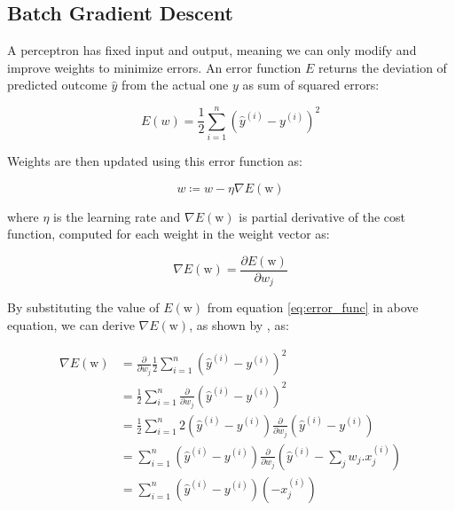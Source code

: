 \subsection{Batch Gradient Descent}\label{subsection:bgd}

A perceptron has fixed input and output, meaning we can only modify and improve weights to minimize errors. An error function $E$ returns the deviation of predicted outcome $\hat{y}$ from the actual one $y$ as sum of squared errors:

\begin{equation}
    \label{eq:error_func}
    E(w) = \frac{1}{2} \sum_{i=1}^{n}(\hat{y}^{(i)} - y^{(i)})^2
\end{equation}

Weights are then updated using this error function as:

\begin{equation}
    \label{eq:weight_update}
    w \coloneqq w - \eta \nabla E(\text{w})
\end{equation}

where $\eta$ is the learning rate and $\nabla E(\text{w})$ is partial derivative of the cost function, computed for each weight in the weight vector as:

\begin{equation}
    \label{eq:part_der}
    \nabla E(\text{w}) = \frac{\partial E(\text{w})}{\partial w_j}
\end{equation}

By substituting the value of $E(\text{w})$ from equation \ref{eq:error_func} in above equation, we can derive $\nabla E(\text{w})$, as shown by \cite{perc_eq}, as:

\begin{align}
    \nabla E(\text{w}) &= \frac{\partial}{\partial w_j}\frac{1}{2} \sum_{i=1}^{n}(\hat{y}^{(i)} - y^{(i)})^2 \nonumber \\
                       &= \frac{1}{2} \sum_{i=1}^{n}\frac{\partial}{\partial w_j}(\hat{y}^{(i)} - y^{(i)})^2 \nonumber \\
                       &= \frac{1}{2} \sum_{i=1}^{n}2(\hat{y}^{(i)} - y^{(i)})\frac{\partial}{\partial w_j}(\hat{y}^{(i)} - y^{(i)}) \nonumber \\
                       &= \sum_{i=1}^{n}(\hat{y}^{(i)} - y^{(i)}) \frac{\partial}{\partial w_j}(\hat{y}^{(i)} - \sum_{j}w_{j}.x_{j}^{(i)}) \nonumber \\
                       &= \sum_{i=1}^{n}(\hat{y}^{(i)} - y^{(i)})(-x_{j}^{(i)}) \label{eq:part_derived}
\end{align}

